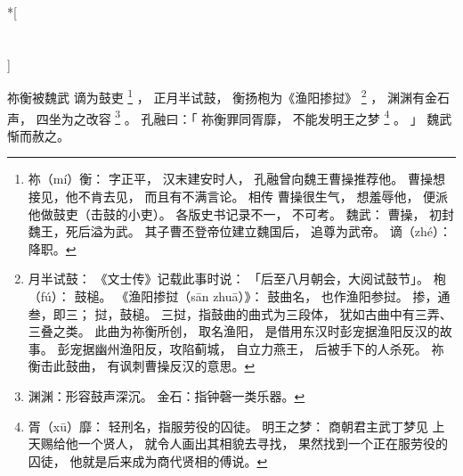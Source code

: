 
\switchcolumn[0]*[\section{}]

祢衡被魏武
谪为鼓吏%
\footnote{%
    祢（mí）衡：
        字正平，
        汉末建安时人，
        孔融曾向魏王曹操推荐他。
        曹操想接见，他不肯去见，
        而且有不满言论。
        相传
        曹操很生气，
        想羞辱他，
        便派他做鼓吏（击鼓的小吏）。
        各版史书记录不一，
        不可考。
    魏武：
        曹操，
        初封魏王，死后溢为武。
        其子曹丕登帝位建立魏国后，
        追尊为武帝。
    谪（zhé）：降职。
}%
，
正月半试鼓，
衡扬枹为《渔阳掺挝》%
\footnote{%
    月半试鼓：
        《文士传》记载此事时说：
        「后至八月朝会，大阅试鼓节」。
    枹（fú）：
        鼓槌。
    《渔阳掺挝（sān zhuā）》：
        鼓曲名，
        也作渔阳参挝。
        掺，通叁，即三；
        挝，鼓槌。
        三挝，指鼓曲的曲式为三段体，
        犹如古曲中有三弄、三叠之类。
        此曲为祢衡所创，
        取名渔阳，
        是借用东汉时彭宠据渔阳反汉的故事。
        彭宠据幽州渔阳反，攻陷蓟城，
        自立力燕王，
        后被手下的人杀死。
        祢衡击此鼓曲，
        有讽刺曹操反汉的意思。
}%
，
渊渊有金石声，
四坐为之改容%
\footnote{%
    渊渊：形容鼓声深沉。
    金石：指钟磬一类乐器。
}%
。
孔融曰：「
    祢衡罪同胥靡，
    不能发明王之梦%
    \footnote{%
        胥（xū）靡：
            轻刑名，指服劳役的囚徒。
        明王之梦：
            商朝君主武丁梦见
            上天赐给他一个贤人，
            就令人画出其相貌去寻找，
            果然找到一个正在服劳役的囚徒，
            他就是后来成为商代贤相的傅说。
    }%
    。
」
魏武惭而赦之。

\switchcolumn


